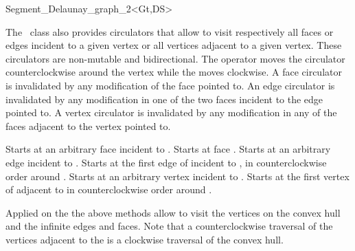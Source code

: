 \begin{ccRefClass}{Segment_Delaunay_graph_2<Gt,DS>}

The \ccRefName\ class also provides circulators that allow to visit
respectively all faces or edges incident to a given vertex or all
vertices adjacent to a given vertex. These circulators are non-mutable
and bidirectional. The operator  moves the circulator
counterclockwise around the vertex while the  moves
clockwise. A face circulator is invalidated by any modification of the
face pointed to. An edge circulator is invalidated by any modification
in one of the two faces incident to the edge pointed to. A vertex
circulator is invalidated by any modification in any of the faces
adjacent to the vertex pointed to.

{Starts at an arbitrary face incident
to .}
\ccGlue
{}
{Starts at face .
}
\ccGlue
{}
{Starts at an arbitrary edge incident
to .}
\ccGlue
{}
{Starts at the first edge of  incident to 
, in counterclockwise order around .
}
\ccGlue
{}
{Starts at an arbitrary  vertex incident
to .}
\ccGlue
{}
{Starts at the first vertex of  adjacent  to 
in  counterclockwise order around .
}




Applied on the 
the above methods  allow to visit the vertices on the convex hull and
the infinite edges and faces. Note that a counterclockwise
traversal of the vertices adjacent to the  is
a clockwise traversal of the convex hull.

\ccGlue
{}
\ccGlue
{}
\ccGlue
{}
\ccGlue
{}
\ccGlue
{}





\end{ccRefClass}

